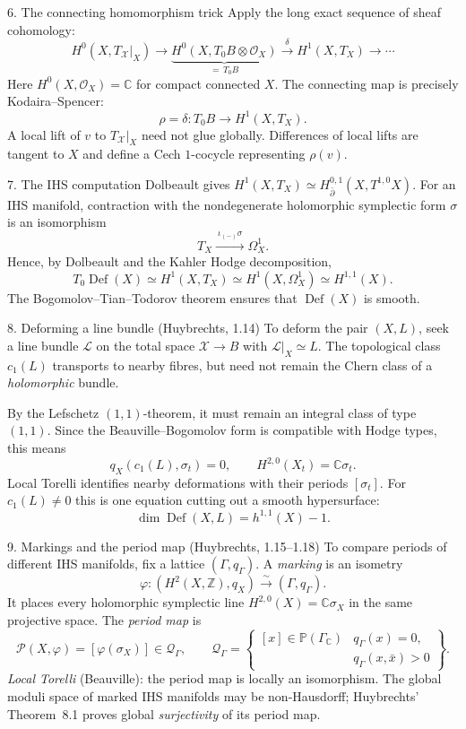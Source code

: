 \documentclass[aspectratio=169]{beamer}
\begin{document}
\begin{frame}{6. The connecting homomorphism trick}
Apply the long exact sequence of sheaf cohomology:
\[
H^0(X,T_{\mathcal X}|_X)\longrightarrow
\underbrace{H^0(X,T_0B\otimes\mathcal O_X)}_{=\,T_0B}
\xrightarrow{\ \delta\ }H^1(X,T_X)\longrightarrow\cdots
\]
Here $H^0(X,\mathcal O_X)=\mathbb C$ for compact connected $X$.
The connecting map is precisely Kodaira--Spencer:
\[
\boxed{\rho=\delta:T_0B\longrightarrow H^1(X,T_X).}
\]
A local lift of $v$ to $T_{\mathcal X}|_X$ need not glue
globally. Differences of local lifts are tangent to $X$
and define a Cech $1$-cocycle representing $\rho(v)$.
\end{frame}
\begin{frame}{7. The IHS computation}
Dolbeault gives $H^1(X,T_X)\simeq
H_{\bar\partial}^{0,1}(X,T^{1,0}X)$.
For an IHS manifold, contraction with the nondegenerate
holomorphic symplectic form $\sigma$ is an isomorphism
\[
T_X\xrightarrow{\ \iota_{(-)}\sigma\ }\Omega_X^1.
\]
Hence, by Dolbeault and the Kahler Hodge decomposition,
\[
\boxed{T_0\operatorname{Def}(X)
\simeq H^1(X,T_X)\simeq H^1(X,\Omega_X^1)
\simeq H^{1,1}(X).}
\]
The Bogomolov--Tian--Todorov theorem ensures that
$\operatorname{Def}(X)$ is smooth.
\end{frame}
\begin{frame}{8. Deforming a line bundle (Huybrechts, 1.14)}
\small
To deform the pair $(X,L)$, seek a line bundle
$\mathcal L$ on the total space $\mathcal X\to B$ with
$\mathcal L|_X\simeq L$.
The topological class $c_1(L)$ transports to nearby
fibres, but need not remain the Chern class of a
\emph{holomorphic} bundle.

\medskip
By the Lefschetz $(1,1)$-theorem, it must remain an
integral class of type $(1,1)$. Since the
Beauville--Bogomolov form is compatible with Hodge types,
this means
\[
\boxed{q_X(c_1(L),\sigma_t)=0,}
\qquad H^{2,0}(X_t)=\mathbb C\sigma_t.
\]
Local Torelli identifies nearby deformations with
their periods $[\sigma_t]$. For $c_1(L)\neq0$ this
is one equation cutting out a smooth hypersurface:
\[
\dim\operatorname{Def}(X,L)=h^{1,1}(X)-1.
\]
\end{frame}

\begin{frame}{9. Markings and the period map (Huybrechts, 1.15--1.18)}
\small
To compare periods of different IHS manifolds, fix a lattice
$(\Gamma,q_\Gamma)$. A \emph{marking} is an isometry
\[
\varphi:(H^2(X,\mathbb Z),q_X)
\xrightarrow{\sim}(\Gamma,q_\Gamma).
\]
It places every holomorphic symplectic line
$H^{2,0}(X)=\mathbb C\sigma_X$ in the same projective space.
The \emph{period map} is
\[
\mathcal P(X,\varphi)=[\varphi(\sigma_X)]
\in\mathcal Q_\Gamma,\qquad
\mathcal Q_\Gamma=
\left\{\begin{array}{l|l}
[x]\in\mathbb P(\Gamma_{\mathbb C})&
q_\Gamma(x)=0,\\[-2pt]
& q_\Gamma(x,\bar x)>0
\end{array}\right\}.
\]
\emph{Local Torelli} (Beauville): the period map is locally
an isomorphism. The global moduli space of marked IHS manifolds
may be non-Hausdorff; Huybrechts' Theorem~8.1 proves
global \emph{surjectivity} of its period map.
\end{frame}
\end{document}
